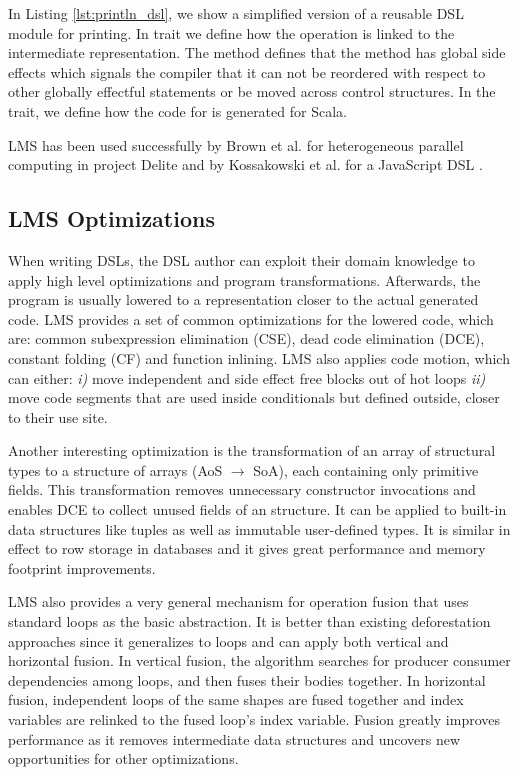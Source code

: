  
In Listing \ref{lst:println_dsl}, we show a simplified version of a reusable DSL
module for printing. In trait  we define how the 
operation is linked to the intermediate representation. The 
method defines that the  method has global side effects which
signals the compiler that it can not be reordered with respect to other globally
effectful statements or be moved across control structures. In the
 trait, we define how the code for  is generated
for Scala.

LMS has been used successfully by Brown et al. for heterogeneous parallel
computing in project Delite \cite{brown_heterogeneous_2011, dsl11} and by
Kossakowski et al. for a JavaScript DSL \cite{greg}.

\subsection{LMS Optimizations}
\label{subsec:lms-optimizations}
When writing DSLs, the DSL author can exploit their domain knowledge to apply
high level optimizations and program transformations. Afterwards, the program is
usually lowered to a representation closer to the actual generated code. LMS
provides a set of common optimizations for the lowered code, which are: common
subexpression elimination (CSE), dead code elimination (DCE), constant folding
(CF) and function inlining. LMS also applies code motion, which can either:
\emph{i)} move independent and side effect free blocks out of hot loops
\emph{ii)} move code segments that are used inside conditionals but defined
outside, closer to their use site.

Another interesting optimization is the transformation of an array of structural
types to a structure of arrays (AoS $\rightarrow$ SoA), each containing only
primitive fields. This transformation removes unnecessary constructor
invocations and enables DCE to collect unused fields of an structure. It can be
applied to built-in data structures like tuples as well as immutable
user-defined types. It is similar in effect to row storage in databases and it
gives great performance and memory footprint improvements.

LMS also provides a very general mechanism for operation fusion that uses
standard loops as the basic abstraction. It is better than existing
deforestation approaches since it generalizes to loops and can apply both
vertical and horizontal fusion. In vertical fusion, the algorithm searches for
producer consumer dependencies among loops, and then fuses their bodies
together. In horizontal fusion, independent loops of the same shapes are fused
together and index variables are relinked to the fused loop's index variable.
Fusion greatly improves performance as it removes intermediate data structures
and uncovers new opportunities for other optimizations.

